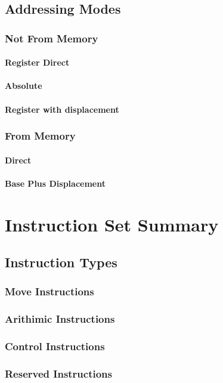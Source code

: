 \documentclass[oneside, a4paper]{memoir}
\begin{document}
\section{Addressing Modes}
\subsection{Not From Memory}
\subsubsection{Register Direct}
\subsubsection{Absolute}
\subsubsection{Register with displacement}
\subsection{From Memory}
\subsubsection{Direct}
\subsubsection{Base Plus Displacement}

\chapter{Instruction Set Summary}
\section{Instruction Types}
\subsection{Move Instructions}
\subsection{Arithimic Instructions}
\subsection{Control Instructions}
\subsection{Reserved Instructions}
\end{document}
